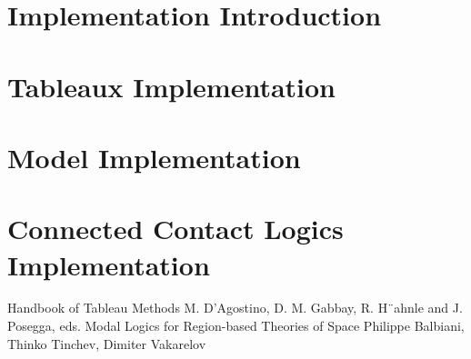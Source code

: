 \documentclass{article}
\begin{document}
	\newpage
	\section{Implementation Introduction}

	\newpage
	\section{Tableaux Implementation}

	\newpage
	\section{Model Implementation}

	\newpage
	\section{Connected Contact Logics Implementation}
	
	\newpage
	\begin{thebibliography}{9}
		Handbook of Tableau Methods
		M. D’Agostino, D. M. Gabbay, R. H¨ahnle and J. Posegga, eds.
		Modal Logics for Region-based Theories of Space
		Philippe Balbiani, Thinko Tinchev, Dimiter Vakarelov
	\end{thebibliography}
\end{document}
